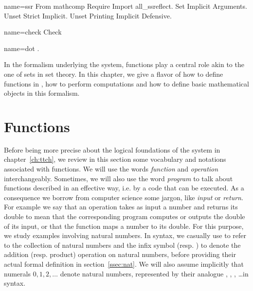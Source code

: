 \begin{coqdef}{name=ssr}
 From mathcomp Require Import all_ssreflect.
 Set Implicit Arguments.
 Unset Strict Implicit.
 Unset Printing Implicit Defensive.
\end{coqdef}
\begin{coqdef}{name=check}
Check
\end{coqdef}
\begin{coqdef}{name=dot}
.
\end{coqdef}

\label{ch:prog}

In the formalism underlying the \Coq{} system, functions play a
central role akin to the one of sets in set theory. In this chapter,
we give a flavor of how to define functions in \Coq{}, how to perform
computations and how to define basic mathematical objects in this
formalism.


\section{Functions}\label{sec:functions}
 Before being more
precise about the logical foundations of the \Coq{} system in
chapter~\ref{ch:ttch},
we review in this section some vocabulary and notations associated
with functions.
We will use the words \emph{function} and \emph{operation}
interchangeably. Sometimes, we will also use the word \emph{program}
to talk about functions described in an effective way, i.e. by a code
that can be executed. As a consequence we borrow from computer science
some jargon, like \emph{input} or \emph{return}. For example we say that
an operation takes as input a number and returns its double to mean
that the corresponding program computes or outputs the double of its
input, or that the function maps a number to its double. For
this purpose, we study examples involving natural numbers. In \Coq{}
syntax, we casually use  to refer to the collection of natural
numbers and the infix symbol  \C{+} (resp. \C{*}) to denote the  addition
(resp. product) operation on natural numbers,  before providing their
actual formal definition in section~\ref{ssec:nat}. We will also
assume implicitly that numerals $0, 1, 2, \dots$ denote natural numbers,
represented by their analogue , , , \dots in \Coq{} syntax.


